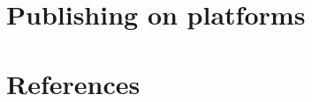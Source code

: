 \documentclass[
]{article}
\begin{document}
\hypertarget{publishing-on-platforms}{%
\section{Publishing on platforms}\label{publishing-on-platforms}}

\hypertarget{references}{%
\section{References}\label{references}}
\end{document}
